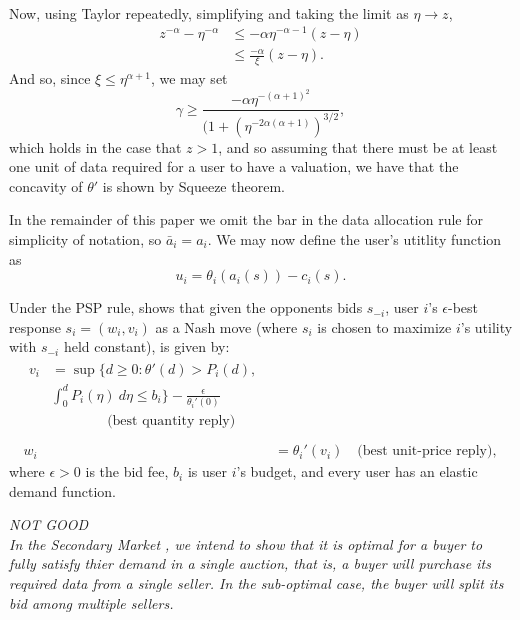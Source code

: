 \documentclass[12pt]{article}
\theoremstyle{definition}
\begin{document}
\begin{multicols}{2}
\begin{itemize}
\begin{align*}
\end{align*}
Now, using Taylor repeatedly, simplifying and taking the limit as $\eta \rightarrow z$,
\begin{align*}
    z^{-\alpha} - \eta^{-\alpha} &\le -\alpha\eta^{-\alpha-1}(z-\eta) \\
    & \le \frac{-\alpha}{\xi}(z-\eta).
\end{align*}
And so, since $\xi \le \eta^{\alpha+1}$,
we may set
$$
    \gamma \ge
\frac{-\alpha\eta^{-(\alpha+1)^2}}{\big(1+(\eta^{-2\alpha(\alpha+1)})^{3/2}},
$$
which holds in the case that $z > 1$, and so assuming that there must be at least one
unit of data required for a user to have
a valuation,  we have that the concavity of $\theta'$ is shown by Squeeze theorem.
\end{itemize}

In the remainder of this paper we omit the bar in the data allocation rule for
simplicity of notation, so $\bar{a}_i = a_i$. We may now define the user's utitlity function as
\begin{equation}\label{buyerutility}
    u_i = \theta_i(a_i(s)) - c_i(s).
\end{equation}

Under the PSP rule, \cite{lazar} shows that given the opponents bids $s_{-i}$,
user $i$'s $\epsilon$-best response $s_i = (w_i, v_i)$ as a Nash move
(where $s_i$ is chosen to maximize $i$'s utility with $s_{-i}$ held constant), is
given by:
\begin{align}
\begin{split}
    v_i &= \sup\bigg\lbrace d \ge 0 : \theta '(d) > P_i(d), \\ 
&\displaystyle\int_0^d P_i(\eta) \ d\eta \le b_i\bigg\rbrace -
\frac{\epsilon}{\theta_i'(0)} \\
&\qquad\qquad \text{(best quantity reply)} \\
\end{split}\\
    w_i &= \theta_i'(v_i) \quad \text{(best unit-price reply)},
\end{align}
where $\epsilon > 0$ is the bid fee, $b_i$ is user $i$'s budget, and every user
has an elastic demand function.

\emph{NOT GOOD\\
In the Secondary Market \cite{zheng}, we intend to show that it is optimal for a
buyer to fully satisfy thier demand in a single auction, that is, a buyer
will purchase its required data from a single seller. In the sub-optimal case,
the buyer will split its bid among multiple sellers. }


\end{multicols}
\end{document}
